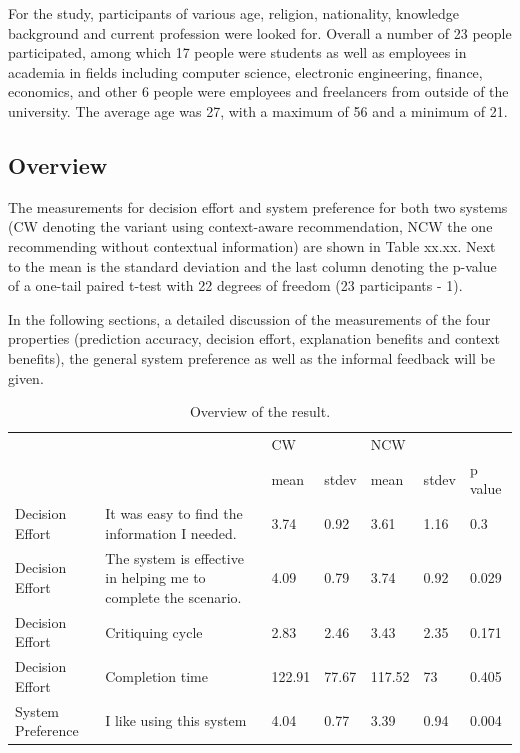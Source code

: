 For the study, participants of various age, religion, nationality, knowledge background and current profession were looked for. Overall a number of 23 people participated, among which 17 people were students as well as employees in academia in fields including computer science, electronic engineering, finance, economics, and other 6 people were employees and freelancers from outside of the university. The average age was 27, with a maximum of 56 and a minimum of 21.

\subsection{Overview} \label{sec:results_o}

The measurements for decision effort and system preference for both two systems (CW denoting the variant using context-aware recommendation, NCW the one recommending without contextual information) are shown in Table xx.xx. Next to the mean is the standard deviation and the last column denoting the p-value of a one-tail paired t-test with 22 degrees of freedom (23 participants - 1).

In the following sections, a detailed discussion of the measurements of the four properties (prediction accuracy, decision effort, explanation benefits and context benefits), the general system preference as well as the informal feedback will be given.

\begin{table}[H]
	\centering
	\caption{Overview of the result.}
	\label{tab:overview}
	\begin{tabular}{p{0.7in}p{1.2in}p{0.5in}p{0.5in}p{0.5in}p{0.5in}p{0.5in}}
		 &  & CW &  & NCW \\ 
 		 &  & mean & stdev & mean & stdev & p value \\ \hline
		 Decision Effort & It was easy to find the information I needed. & 3.74 & 0.92 & 3.61 & 1.16 & 0.3 \\ 
		Decision Effort & The system is effective in helping me to complete the scenario. & 4.09 & 0.79 & 3.74 & 0.92 & 0.029 \\ 
		Decision Effort & Critiquing cycle & 2.83 & 2.46 & 3.43 & 2.35 & 0.171 \\ 
		Decision Effort & Completion time & 122.91 & 77.67 & 117.52 & 73 & 0.405 \\ 
		System Preference & I like using this system & 4.04 & 0.77 & 3.39 & 0.94 & 0.004 \\ \hline
	\end{tabular}
\end{table}

